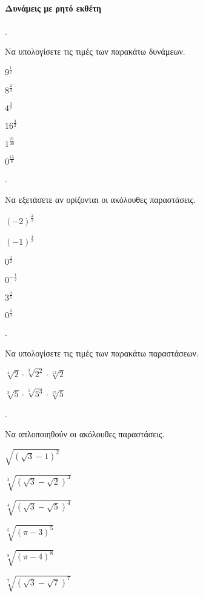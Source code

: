 \documentclass[11pt,a4paper,twocolumn]{article}
\newcounter{askhsh}
\newcommand{\askhsh}{\large\theaskhsh.\ \addtocounter{askhsh}{1}}
\begin{document}
\paragraph{Δυνάμεις με ρητό εκθέτη}
\askhsh Να υπολογίσετε τις τιμές των παρακάτω δυνάμεων.
\begin{multicols}{3}
\begin{alist}
\item $9^{\frac{1}{2}}$
\item $8^{\frac{2}{3}}$
\item $4^{\frac{3}{2}}$
\item $16^{\frac{3}{2}}$
\item $1^{\frac{21}{20}}$
\item $0^{\frac{15}{8}}$
\end{alist}
\end{multicols}
\askhsh Να εξετάσετε αν ορίζονται οι ακόλουθες παραστάσεις.
\begin{multicols}{3}
\begin{alist}
\item $(-2)^{\frac{2}{3}}$
\item $(-1)^{\frac{4}{3}}$
\item $0^{\frac{3}{2}}$
\item $0^{-\frac{1}{2}}$
\item $3^{\frac{3}{5}}$
\item $0^{\frac{2}{3}}$
\end{alist}
\end{multicols}
\askhsh Να υπολογίσετε τις τιμές των παρακάτω παραστάσεων.
\begin{multicols}{2}
\begin{alist}
\item $\sqrt[4]{2}\cdot\sqrt[3]{2^2}\cdot\sqrt[12]{2}$
\item $\sqrt[3]{5}\cdot\sqrt[5]{5^3}\cdot\sqrt[15]{5}$
\end{alist}
\end{multicols}
\askhsh Να απλοποιηθούν οι ακόλουθες παραστάσεις.
\begin{multicols}{2}
\begin{alist}
\item $\sqrt{\left(\sqrt{3}-1\right)^2}$
\item $\sqrt[3]{\left(\sqrt{3}-\sqrt{2}\right)^3}$
\item $\sqrt[4]{\left(\sqrt{3}-\sqrt{5}\right)^4}$
\item $\sqrt[5]{\left(\pi-3\right)^5}$
\item $\sqrt[8]{\left(\pi-4\right)^8}$
\item $\sqrt[7]{\left(\sqrt{3}-\sqrt{7}\right)^7}$
\end{alist}
\end{multicols}
\end{document}
